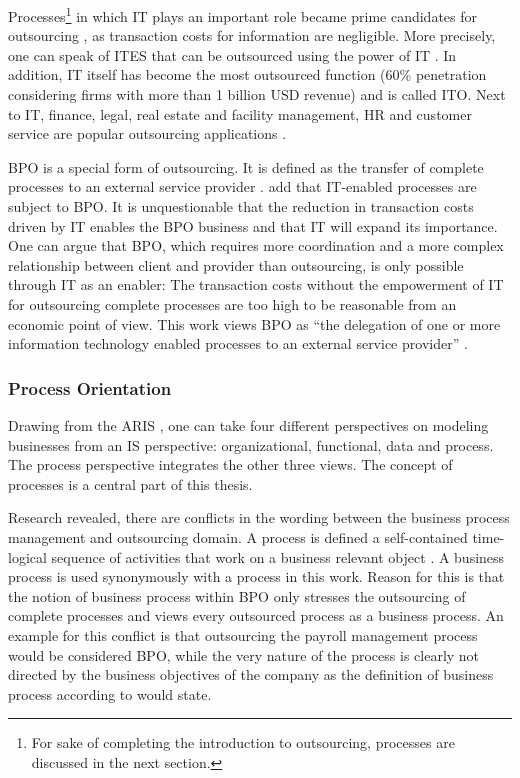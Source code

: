 		
		Processes\footnote{For sake of completing the introduction to outsourcing, processes are discussed in the next section. } in which IT plays an important role became prime candidates for outsourcing \citep[]{gross2006}, as transaction costs for information are negligible. More precisely, one can speak of \acrfull{ITES} that can be outsourced using the power of IT \citep[]{Ramachandran2004}. In addition, IT itself has become the most outsourced function (60\% penetration \citep{deloitte2014outsourcing} considering firms with more than 1 billion USD revenue) and is called \acrfull{ITO}. Next to IT, finance, legal, real estate and facility management, HR and customer service are popular outsourcing applications \citep{deloitte2014outsourcing}. 
		
		\acrshort{BPO} is a special form of outsourcing. It is defined as the transfer of complete processes to an external service provider \citep{wullenweber2008impact}. \cite{mani2010emp} add that IT-enabled processes are subject to BPO. It is unquestionable that the reduction in transaction costs driven by IT enables the BPO business and that IT will expand its importance. One can argue that BPO, which requires more coordination and a more complex relationship between client and provider than outsourcing, is only possible through IT as an enabler: The transaction costs without the empowerment of IT for outsourcing complete processes are too high to be reasonable from an economic point of view. This work views  BPO as \enquote{the delegation of one or more information technology enabled processes to an external service provider} \citep[]{mani2010emp}.
		
		\subsubsection{Process Orientation}
		\label{processorientation}
	Drawing from the  \acrfull{ARIS} \citep{Scheer1997}, one can take four different perspectives on modeling businesses from an \acrshort{IS} perspective: organizational, functional, data and process. The process perspective integrates the other three views. The concept of processes is a central part of this thesis. 

	Research revealed, there are conflicts in the wording between the business process management and outsourcing domain. A process is defined a self-contained time-logical sequence of activities that work on a business relevant object \citep[]{becker2012pm}.
	A business process is used synonymously with a process in this work. Reason for this is that the notion of business process within BPO only stresses the outsourcing of complete processes and views every outsourced process as a business process.  An example for this conflict is that outsourcing the payroll management process would be considered \acrshort{BPO}, while the very nature of the process is clearly not directed by the business objectives of the company as the definition of business process according to \citep[]{becker2012pm} would state. 
	
